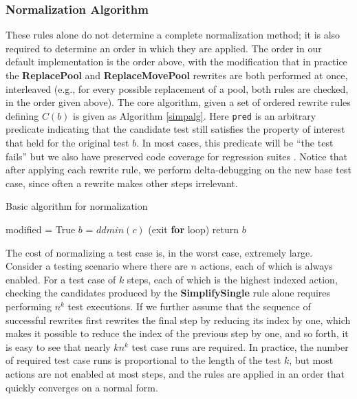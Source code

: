 \subsubsection{Normalization Algorithm}

These rules alone do not determine a complete normalization method; it is
also required to determine an order in which they are applied.  The
order in our default implementation is the order above, with the
modification that in practice the {\bf ReplacePool} and {\bf
  ReplaceMovePool} rewrites are both performed at once, interleaved
(e.g., for every possible replacement of a pool, both rules are
checked, in the order given above).  The core algorithm, given a set
of ordered rewrite rules defining $C(b)$ is given as Algorithm
\ref{simpalg}.  Here {\tt pred} is an arbitrary predicate indicating
that the candidate test still satisfies the property of interest that
held for the original test $b$.  In most cases, this predicate will be
``the test fails'' but we also have preserved
code coverage for regression suites \cite{icst2014}.  Notice that
after applying each rewrite rule, we perform delta-debugging on the
new base test case, since often a rewrite makes other steps irrelevant.

\begin{algorithm}
\caption{Basic algorithm for normalization}
\label{simpalg}
\begin{algorithmic}[1]
\State modified = True 
\State $b$ = $ddmin(c)$
 (exit {\bf for} loop) 
\EndIf 
\EndFor 
\EndWhile 
\State return $b$
\end{algorithmic}
\end{algorithm}

The cost of normalizing a test case is, in the worst case, extremely
large.  Consider a testing scenario where there are $n$ actions, each
of which is always enabled.  For a test case of $k$ steps, each of
which is the highest indexed action, checking the candidates produced
by the {\bf SimplifySingle} rule alone requires performing $n^k$
test executions.  If we further assume that the sequence of successful rewrites
first rewrites the final step by reducing its index by one, which
makes it possible to reduce the index of the previous step by one, and
so forth, it is easy to see that nearly $k n^k$ test case runs are
required.  In practice, the number of required test case runs is
proportional to the length of the test $k$, but most actions are not
enabled at most steps, and the rules are applied in an order that
quickly converges on a normal form.


